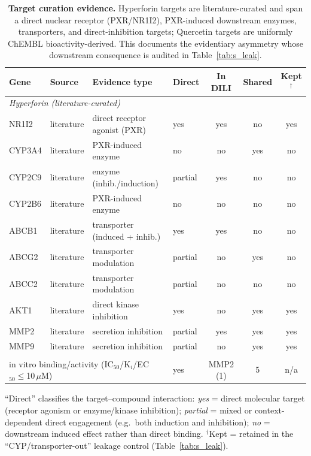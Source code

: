 \begin{table}[ht]
\centering
\caption{\textbf{Target curation evidence.} Hyperforin targets are literature-curated and span a direct nuclear receptor (PXR/NR1I2), PXR-induced downstream enzymes, transporters, and direct-inhibition targets; Quercetin targets are uniformly ChEMBL bioactivity-derived. This documents the evidentiary asymmetry whose downstream consequence is audited in Table~\ref{tab:s_leak}.}
\label{tab:s_evidence}
\small
\begin{tabular}{@{}llllccc@{}}
\toprule
\textbf{Gene} & \textbf{Source} & \textbf{Evidence type} & \textbf{Direct} & \textbf{In DILI} & \textbf{Shared} & \textbf{Kept$^\dagger$} \\
\midrule
\multicolumn{7}{l}{\textit{Hyperforin (literature-curated)}}\\
NR1I2  & literature & direct receptor agonist (PXR) & yes     & yes & no  & yes \\
CYP3A4 & literature & PXR-induced enzyme            & no      & no  & yes & no  \\
CYP2C9 & literature & enzyme (inhib./induction)     & partial & yes & no  & no  \\
CYP2B6 & literature & PXR-induced enzyme            & no      & no  & no  & no  \\
ABCB1  & literature & transporter (induced + inhib.)& yes     & yes & no  & no  \\
ABCG2  & literature & transporter modulation        & partial & no  & yes & no  \\
ABCC2  & literature & transporter modulation        & partial & no  & no  & no  \\
AKT1   & literature & direct kinase inhibition      & yes     & no  & yes & yes \\
MMP2   & literature & secretion inhibition          & partial & yes & yes & yes \\
MMP9   & literature & secretion inhibition          & partial & no  & yes & yes \\
\addlinespace
\multicolumn{7}{l}{\textit{Quercetin (ChEMBL bioactivity, CHEMBL159; 62 targets, full list Table~\ref{tab:s_quer})}}\\
\multicolumn{3}{l}{in vitro binding/activity (IC$_{50}$/K$_i$/EC$_{50}\leq$10\,$\mu$M)} & yes & MMP2 (1) & 5 & n/a \\
\bottomrule
\end{tabular}

\vspace{0.3em}
\begin{minipage}{\linewidth}\footnotesize ``Direct'' classifies the target--compound interaction: \textit{yes} = direct molecular target (receptor agonism or enzyme/kinase inhibition); \textit{partial} = mixed or context-dependent direct engagement (e.g.\ both induction and inhibition); \textit{no} = downstream induced effect rather than direct binding. $^\dagger$Kept = retained in the ``CYP/transporter-out'' leakage control (Table~\ref{tab:s_leak}).\end{minipage}
\end{table}

